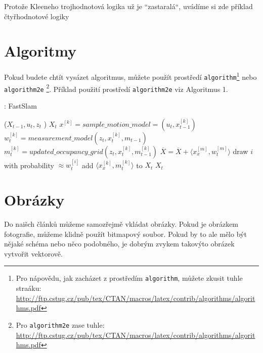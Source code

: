 \documentclass[11pt,a4paper]{article}
\begin{document}
\begin{table}[h]
\begin{center}
	\end{center}
	\caption{Protože Kleeneho trojhodnotová logika už je ``zastaralá``, uvádíme si zde příklad čtyřhodnotové logiky}
	\label{tab:tab2}
\end{table}



\newpage
\section{Algoritmy}
Pokud budete chtít vysázet algoritmus, můžete použít prostředí \texttt{algorithm}\footnote{Pro nápovědu, jak zacházet z prostředím \texttt{algorithm}, můžete zkusit tuhle straáku: \url{http://ftp.cstug.cz/pub/tex/CTAN/macros/latex/contrib/algorithms/algorithms.pdf}} nebo \texttt{algorithm2e} \footnote{Pro \texttt{algorithm2e} zase tuhle: \url{http://ftp.cstug.cz/pub/tex/CTAN/macros/latex/contrib/algorithms/algorithms.pdf}}. Příklad použití prostředí \texttt{algorithm2e} viz Algoritmus 1.

\begin{algorithm}
	\caption{: FastSlam} 
	\begin{algorithmic}[1]
		\REQUIRE ($X_{t-1},u_t,z_t$ ) 
		\ENSURE $X_{t}$
			\STATE $x^{[k]} = sample\_motion\_model = (u_t, x^{[k]}_{t-1})$
			\STATE $w^{[k]}_t = measurement\_model (z_t, x^{[k]}_t, m_{t-1}) $
			\STATE $m^{[k]}_t = updated\_occupancy\_grid (z_t, x^{[k]}_t, m^{[k]}_{t-1}) $
			\STATE $\overline{X} = \overline{X} + \langle x^{[m]}_x, w^{[m]}_t \rangle $		
		\ENDFOR
			\STATE draw $i$ with probability $\approx w^{[i]}_t$
			\STATE add $\langle x^{[k]}_x, m^{[k]}_t \rangle$ to $X_t$   		
		\ENDFOR
		\RETURN $X_t$
	\end{algorithmic}
	\label{alg:alg1}
\end{algorithm}

\section{Obrázky}
Do naišch článků můžeme samozřejmě vkládat obrázky. Pokud je obrázkem fotografie, můžeme klidně použít bitmapový soubor. Pokud by to ale mělo být nějaké schéma nebo něco podobného, je dobrým zvykem takovýto
obrázek vytvořit vektorově.
\end{document}
